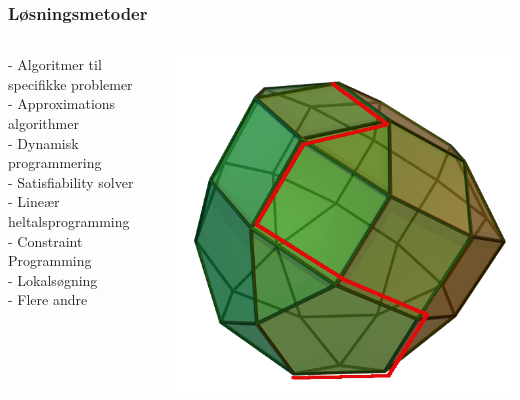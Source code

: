 \documentclass[smaller]{beamer}
\begin{document}
\begin{frame}
 \frametitle{Løsningsmetoder}
 \begin{columns}[T]
 \begin{column}[T]{.5\textwidth} \vfill
  - Algoritmer til specifikke problemer  \\ \hspace{1cm}\pause
      - Approximations algorithmer \\  \hspace{1cm}\pause 
      - Dynamisk programmering \\ \pause
 - Satisfiability solver \\ \pause 
 - Lineær heltalsprogramming \\ \pause 
 - \alert{Constraint Programming} \\ \pause
 - \alert{Lokalsøgning} \\ \pause
 - Flere andre
 \end{column} 
\begin{column}[T]{.5\textwidth} \vfill
\includegraphics[scale=0.2]{lokals6.png}
\end{column}
\end{columns}
 
\end{frame}

\end{document}
